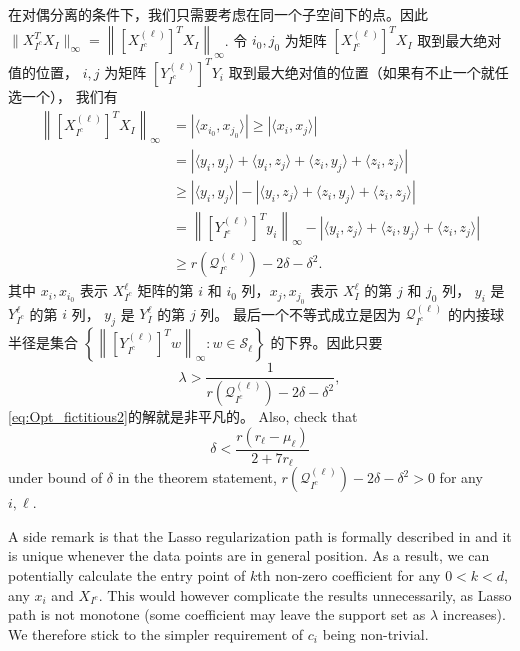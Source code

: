 \documentclass{ctexart}
\begin{document}
在对偶分离的条件下，我们只需要考虑在同一个子空间下的点。因此 $\|X_{I^c}^T X_I\|_{\infty} = 
\left\|[X_{I^c}^{(\ell)}]^T X_I\right\|_{\infty}$. 令 $i_0, j_0$ 为矩阵
$[X_{I^c}^{(\ell)}]^T X_I$ 取到最大绝对值的位置， $i,j$ 为矩阵
$[Y_{I^c}^{(\ell)}]^T Y_i$ 取到最大绝对值的位置（如果有不止一个就任选一个），
我们有
\begin{align}
  \left\|[X_{I^c}^{(\ell)}]^TX_I\right\|_{\infty}&=\left|\langle x_{i_0},
  x_{j_0}\rangle\right|  \geq \left|\langle x_i, x_j\rangle\right|\nonumber\\
  &= \left|\langle y_i, y_j\rangle  + \langle y_i, z_j\rangle + \langle z_i, y_j\rangle + \langle z_i, z_j\rangle\right|\nonumber\\
  &\geq \left|\langle y_i, y_j\rangle\right| - \left|\langle y_i, z_j\rangle + \langle z_i, y_j\rangle + \langle z_i, z_j\rangle\right|\nonumber\\
  & = \left\|[Y_{I^c}^{(\ell)}]^Ty_i\right\|_{\infty} - \left|\langle y_i, z_j\rangle + \langle z_i, y_j\rangle + \langle z_i, z_j\rangle\right|\nonumber\\
  &\geq r(\mathcal{Q}^{(\ell)}_{I^c}) - 2\delta - \delta^2. \label{eq:lowerbounding_max_affinity}
\end{align}
其中 $x_i, x_{i_0}$ 表示 $X_{I^c}^{\ell}$ 矩阵的第 $i$ 和 $i_0$ 列，$x_j,
x_{j_0}$ 表示 $X_I^{\ell}$ 的第 $j$ 和 $j_0$ 列， $y_i$ 是 $Y_{I^c}^{\ell}$
的第 $i$ 列， $y_j$ 是 $Y_I^{\ell}$ 的第 $j$ 列。 最后一个不等式成立是因为 $\mathcal{Q}^{(\ell)}_{I^c}$ 
的内接球半径是集合 $\left\{\left\| [ Y_{I^c}^{(\ell)}]^T w\right\|_\infty: w
\in  \mathcal{S}_{\ell}\right\} $ 的下界。因此只要
\begin{equation}\label{eq:lambda_low}
  \lambda > \frac{1}{ r(\mathcal{Q}^{(\ell)}_{I^c}) - 2\delta - \delta^2},
\end{equation}
\eqref{eq:Opt_fictitious2}的解就是非平凡的。 Also, check that
\begin{equation}\label{eq:deterministic_delta}
\delta<\frac{r(r_\ell - \mu_\ell)}{2+7r_\ell}
\end{equation}
under bound of $\delta$ in the theorem statement,  $r(\mathcal{Q}^{(\ell)}_{I^c}) - 2\delta - \delta^2>0$ for any $i,\ell$.

A side remark is that the Lasso regularization path is formally described in \cite{tibshirani2013lasso} and it is unique whenever the data points are in general position. As a result, we can potentially calculate the entry point of $k$th non-zero coefficient for any $0<k<d$, any $x_i$ and $X_{I^c}$. This would however complicate the results unnecessarily, as Lasso path is not monotone (some coefficient may leave the support set as $\lambda$ increases). We therefore stick to the simpler requirement of $c_i$ being non-trivial.
\end{document}
